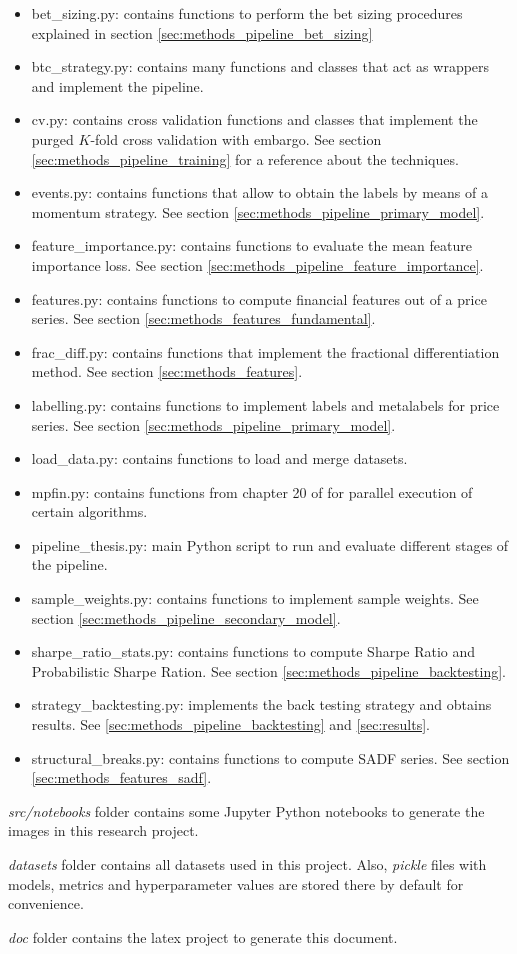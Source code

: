 \begin{itemize}
  \item bet\_sizing.py: contains functions to perform the bet sizing procedures explained in section \ref{sec:methods_pipeline_bet_sizing}
  \item btc\_strategy.py: contains many functions and classes that act as wrappers and implement the pipeline.
  \item cv.py: contains cross validation functions and classes that implement the purged $K$-fold cross validation with embargo. See section \ref{sec:methods_pipeline_training} for a reference about the techniques.
  \item events.py: contains functions that allow to obtain the labels by means of a momentum strategy. See section \ref{sec:methods_pipeline_primary_model}.
  \item feature\_importance.py: contains functions to evaluate the mean feature importance loss. See section \ref{sec:methods_pipeline_feature_importance}.
  \item features.py: contains functions to compute financial features out of a price series. See section \ref{sec:methods_features_fundamental}.
  \item frac\_diff.py: contains functions that implement the fractional differentiation method. See section \ref{sec:methods_features}.
  \item labelling.py: contains functions to implement labels and metalabels for price series. See section \ref{sec:methods_pipeline_primary_model}.
  \item load\_data.py: contains functions to load and merge datasets.
  \item mpfin.py: contains functions from chapter 20 of \cite{lopez_de_prado} for parallel execution of certain algorithms.
  \item pipeline\_thesis.py: main Python script to run and evaluate different stages of the pipeline.
  \item sample\_weights.py: contains functions to implement sample weights. See section \ref{sec:methods_pipeline_secondary_model}.
  \item sharpe\_ratio\_stats.py: contains functions to compute Sharpe Ratio and Probabilistic Sharpe Ration. See section \ref{sec:methods_pipeline_backtesting}.
  \item strategy\_backtesting.py: implements the back testing strategy and obtains results. See \ref{sec:methods_pipeline_backtesting} and \ref{sec:results}.
  \item structural\_breaks.py: contains functions to compute SADF series. See section \ref{sec:methods_features_sadf}. 
\end{itemize}

\emph{src/notebooks} folder contains some Jupyter Python notebooks to generate the images in this research project.

\emph{datasets} folder contains all datasets used in this project. Also, \emph{pickle} files with models, metrics and hyperparameter values are stored there by default for convenience.

\emph{doc} folder contains the latex project to generate this document.
